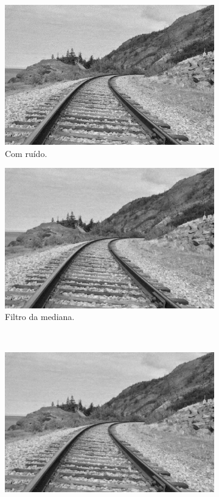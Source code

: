 \documentclass[10pt,a4paper]{article}
\begin{document}
\begin{figure}[!ht]
    \begin{subfigure}[ht]{0.45\textwidth}
        \includegraphics[width=\textwidth]{ga.jpg}
        \caption{Com ruído.}
    \end{subfigure}
    \qquad
    \begin{subfigure}[ht]{0.45\textwidth}
        \includegraphics[width=\textwidth]{ga_median.jpg}
        \caption{Filtro da mediana.}
    \end{subfigure}
    \\
    \begin{subfigure}[ht]{0.45\textwidth}
        \includegraphics[width=\textwidth]{ga_gaussian.jpg}

\end{subfigure}
\end{figure}
\end{document}
